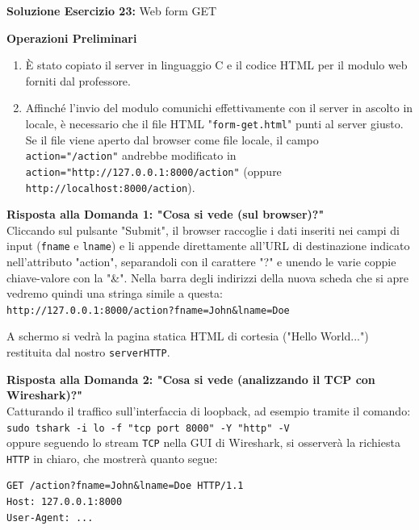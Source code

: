 \documentclass[11pt]{article}
\begin{document}
\begin{tcolorbox}[colback=green!5!white,colframe=green!75!black,title=\textbf{RISPOSTA}, breakable]
\textbf{Soluzione Esercizio 23:} Web form GET

\textbf{Operazioni Preliminari}
\begin{enumerate}
    \item È stato copiato il server in linguaggio C e il codice HTML per il modulo web forniti dal professore.
    \item Affinché l'invio del modulo comunichi effettivamente con il server in ascolto in locale, è necessario che il file HTML "\texttt{form-get.html}" punti al server giusto. Se il file viene aperto dal browser come file locale, il campo \texttt{action="/action"} andrebbe modificato in \texttt{action="http://127.0.0.1:8000/action"} (oppure \texttt{http://localhost:8000/action}).
\end{enumerate}

\textbf{Risposta alla Domanda 1: "Cosa si vede (sul browser)?"}\\
Cliccando sul pulsante "Submit", il browser raccoglie i dati inseriti nei campi di input (\texttt{fname} e \texttt{lname}) e li appende direttamente all'URL di destinazione indicato nell'attributo "action", separandoli con il carattere "?" e unendo le varie coppie chiave-valore con la "\&".
Nella barra degli indirizzi della nuova scheda che si apre vedremo quindi una stringa simile a questa:\\
\texttt{http://127.0.0.1:8000/action?fname=John\&lname=Doe}

A schermo si vedrà la pagina statica HTML di cortesia ("Hello World...") restituita dal nostro \texttt{serverHTTP}.

\textbf{Risposta alla Domanda 2: "Cosa si vede (analizzando il TCP con Wireshark)?"}\\
Catturando il traffico sull'interfaccia di loopback, ad esempio tramite il comando:\\
\texttt{sudo tshark -i lo -f "tcp port 8000" -Y "http" -V}\\
oppure seguendo lo stream \texttt{TCP} nella GUI di Wireshark, si osserverà la richiesta \texttt{HTTP} in chiaro, che mostrerà quanto segue:

\begin{lstlisting}[basicstyle=\ttfamily\small]
GET /action?fname=John&lname=Doe HTTP/1.1
Host: 127.0.0.1:8000
User-Agent: ...
\end{lstlisting}


\end{tcolorbox}
\end{document}

